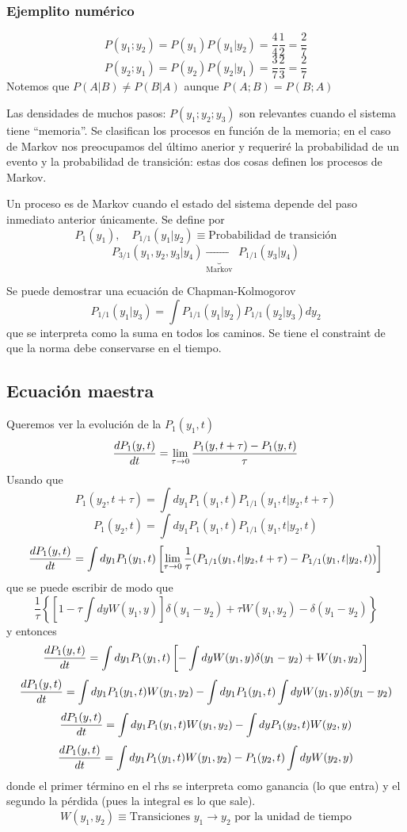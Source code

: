 \documentclass[10pt,oneside]{CBFT_book}
\begin{document}
\subsubsection{Ejemplito numérico}

\[
	P(y_1;y_2) = P(y_1)P(y_1|y_2) = \frac{4}{4}\frac{1}{2} = \frac{2}{7}
\]
\[
	P(y_2;y_1) = P(y_2)P(y_2|y_1)  = \frac{3}{7}\frac{2}{3} = \frac{2}{7}
\]
Notemos que $P(A|B) \neq P(B|A)$ aunque $P(A;B) = P(B;A)$

Las densidades de muchos pasos: $P(y_1;y_2;y_3)$ son relevantes cuando el sistema tiene ``memoria''.
Se clasifican los procesos en función de la memoria; en el caso de Markov nos preocupamos del último
anerior y requeriré la probabilidad de un evento y la probabilidad de transición: estas dos cosas
definen los procesos de Markov.

Un proceso es de Markov cuando el estado del sistema depende del paso inmediato anterior únicamente.
Se define por 
\[
	P_1(y_1) , \quad P_{1/1}(y_1|y_2) \equiv \text{Probabilidad de transición} 
\]
\[
	P_{3/1}(y_1,y_2,y_3|y_4) \underbrace{\rightarrow}_{\text{Markov}} \; P_{1/1}(y_3|y_4)
\]

Se puede demostrar una ecuación de Chapman-Kolmogorov
\[
	P_{1/1}(y_1|y_3) = \int P_{1/1}(y_1|y_2) P_{1/1}(y_2|y_3) dy_2
\]
que se interpreta como la suma en todos los caminos. Se tiene el constraint de que la norma debe
conservarse en el tiempo.

\subsection{Ecuación maestra}

Queremos ver la evolución de la $P_1(y_1,t)$
\[
	\frac{d^{\hspace{-0.05em}} {P_1(y,t)}}{d {t}^{\hspace{-0.05em}}} = \lim_{\tau \to 0} \frac{P_1(y,t+\tau) - P_1(y,t) }{\tau}
\]
Usando que
\[
	P_1(y_2,t+\tau) = \int dy_1 P_1(y_1,t) P_{1/1}(y_1,t|y_2,t+\tau) 
\]
\[
	P_1(y_2,t) = \int dy_1 P_1(y_1,t) P_{1/1}(y_1,t|y_2,t) 
\]
\[
	\frac{d^{\hspace{-0.05em}} {P_1(y,t)}}{d {t}^{\hspace{-0.05em}}} = \int dy_1 P_1(y_1,t) \left[ \lim_{\tau \to 0} 
	\frac{1}{\tau} (P_{1/1}(y_1,t|y_2,t+\tau) - P_{1/1}(y_1,t|y_2,t))   \right]
\]
que se puede escribir de modo que 
\[
	\frac{1}{\tau} \left\{ [ 1 - \tau \int dy W(y_1,y)]\delta(y_1 - y_2) + 
	\tau W(y_1,y_2) - \delta(y_1-y_2) \right\}
\]
y entonces 
\[
	\frac{d^{\hspace{-0.05em}} {P_1(y,t)}}{d {t}^{\hspace{-0.05em}}} = \int dy_1 P_1(y_1,t) 
	\left[ -\int dy W(y_1,y) \delta(y_1-y_2) + W(y_1,y_2) \right]
\]
\[
	\frac{d^{\hspace{-0.05em}} {P_1(y,t)}}{d {t}^{\hspace{-0.05em}}} = \int dy_1 P_1(y_1,t) W(y_1,y_2) - \int dy_1 P_1(y_1,t) \int dy W(y_1,y)\delta(y_1-y_2)
\]
\[
	\frac{d^{\hspace{-0.05em}} {P_1(y,t)}}{d {t}^{\hspace{-0.05em}}} = \int dy_1 P_1(y_1,t) W(y_1,y_2) - \int dy P_1(y_2,t) W(y_2,y)
\]
\[
	\frac{d^{\hspace{-0.05em}} {P_1(y,t)}}{d {t}^{\hspace{-0.05em}}} = \int dy_1 P_1(y_1,t) W(y_1,y_2) - P_1(y_2,t) \int dy  W(y_2,y)
\]
donde el primer término en el rhs se interpreta como ganancia (lo que entra) y el segundo la
pérdida (pues la integral es lo que sale).
\[
	W(y_1,y_2) \equiv \text{Transiciones $y_1\to y_2$ por la unidad de tiempo}
\]
\end{document}
